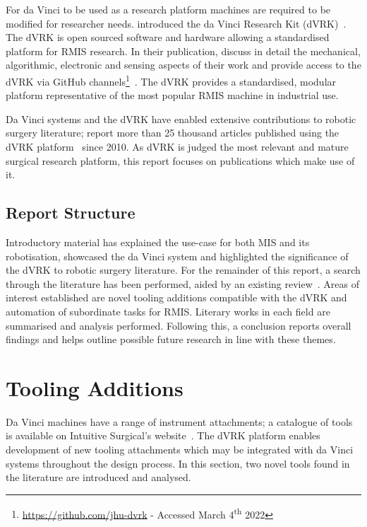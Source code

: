 \documentclass[english]{sobraep}
\begin{document}
\par{For da Vinci to be used as a research platform machines are required to be modified for researcher needs.  \citeauthor{dvrk} introduced the da Vinci Research Kit (dVRK)~\cite{dvrk}. The dVRK is open sourced software and hardware allowing a standardised platform for RMIS research. In their publication, \citeauthor{dvrk} discuss in detail the mechanical, algorithmic, electronic and sensing aspects of their work and provide access to the dVRK via GitHub channels\footnote{\url{https://github.com/jhu-dvrk} - Accessed March 4\textsuperscript{th} 2022}~\cite{dvrk}. The dVRK provides a standardised, modular platform representative of the most popular RMIS machine in industrial use.}

\par{Da Vinci systems and the dVRK have enabled extensive contributions to robotic surgery literature; \citeauthor{10-years-dvrk} report more than 25 thousand articles published using the dVRK platform~\cite{10-years-dvrk} since 2010. As dVRK is judged the most relevant and mature surgical research platform, this report focuses on publications which make use of it. }


\subsection{Report Structure}
\par{Introductory material has explained the use-case for both MIS and its robotisation, showcased the da Vinci system and highlighted the significance of the dVRK to robotic surgery literature. For the remainder of this report, a search through the literature has been performed, aided by an existing review~\cite{10-years-dvrk}. Areas of interest established are novel tooling additions compatible with the dVRK and automation of subordinate tasks for RMIS. Literary works in each field are summarised and analysis performed. Following this, a conclusion reports overall findings and helps outline possible future research in line with these themes. }

\section{Tooling Additions}\label{sec:mechanical}
\par{Da Vinci machines have a range of instrument attachments; a catalogue of tools is available on Intuitive Surgical's website~\cite{da-vinci-catalogue}. 
The dVRK platform enables development of new tooling attachments which may be integrated with da Vinci systems throughout the design process. In this section, two novel tools found in the literature are introduced and analysed.} 
\end{document}
